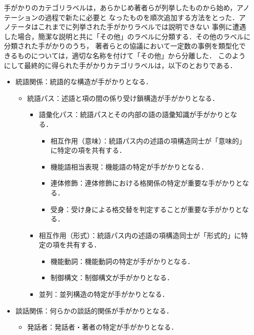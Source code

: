 \documentclass[japanese]{jnlp_1.4}
\begin{document}
手がかりのカテゴリラベルは，あらかじめ著者らが列挙したものから始め，アノテーションの過程で新たに必要と
なったものを順次追加する方法をとった．アノテータはこれまでに列挙された手がかりラベルでは説明できない
事例に遭遇した場合，簡潔な説明と共に「その他」のラベルに分類する．その他のラベルに分類された手がかりのうち，
著者らとの協議において一定数の事例を類型化できるものについては，適切な名称を付けて「その他」から分離した．
このようにして最終的に得られた手がかりカテゴリラベルは，以下のとおりである．

\begin{itemize}
    \item 統語関係：統語的な構造が手がかりとなる．
    \begin{itemize}
        \item 統語パス：述語と項の間の係り受け鎖構造が手がかりとなる．
        \begin{itemize}
            \item 語彙化パス：統語パスとその内部の語の語彙知識が手がかりとなる．
            \begin{itemize}
                \item 相互作用（意味）：統語パス内の述語の項構造同士が「意味的」に特定の項を共有する．
                \item 機能語相当表現：機能語の特定が手がかりとなる．
                \item 連体修飾：連体修飾における格関係の特定が重要な手がかりとなる．
                \item 受身：受け身による格交替を判定することが重要な手がかりとなる．
            \end{itemize}
            \item 相互作用（形式）：統語パス内の述語の項構造同士が「形式的」に特定の項を共有する．
            \begin{itemize}
                \item 機能動詞：機能動詞の特定が手がかりとなる．
                \item 制御構文：制御構文が手がかりとなる．
            \end{itemize}
            \item 並列：並列構造の特定が手がかりとなる．
        \end{itemize}
    \end{itemize}
    \item 談話関係：何らかの談話的関係が手がかりとなる．
    \begin{itemize}
        \item 発話者：発話者・著者の特定が手がかりとなる．

\end{itemize}
\end{itemize}
\end{document}
